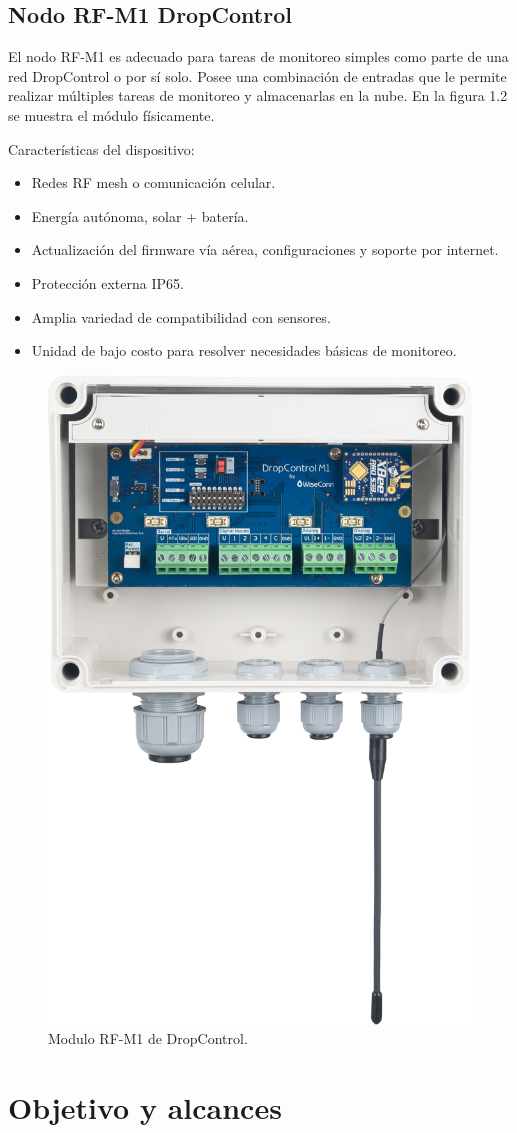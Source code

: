 \vspace{1cm}

\subsection{Nodo RF-M1 DropControl}

El nodo RF-M1 es adecuado para tareas de monitoreo simples como parte de una red DropControl o por sí solo. Posee una combinación de entradas que le permite realizar múltiples tareas de monitoreo y almacenarlas en la nube. En la figura 1.2 se muestra el módulo físicamente\citep{ModuloAgricultureDos}.

Características del dispositivo: 
\begin{itemize}
  \item Redes RF mesh o comunicación celular.
  \item Energía autónoma, solar + batería.
  \item Actualización del firmware vía aérea, configuraciones y soporte por internet.
  \item Protección externa IP65.
  \item Amplia variedad de compatibilidad con sensores.
  \item Unidad de bajo costo para resolver necesidades básicas de monitoreo. 
\end{itemize}

\begin{figure}[htbp]
	\centering
	\includegraphics[width=.3\textwidth]{./Figures/modulo_dropcontrol.png}
	\caption{Modulo RF-M1 de DropControl.}
	\label{fig:texmaker}
\end{figure}

\vspace{1cm}
\vspace{30cm}

\section{Objetivo y alcances}


